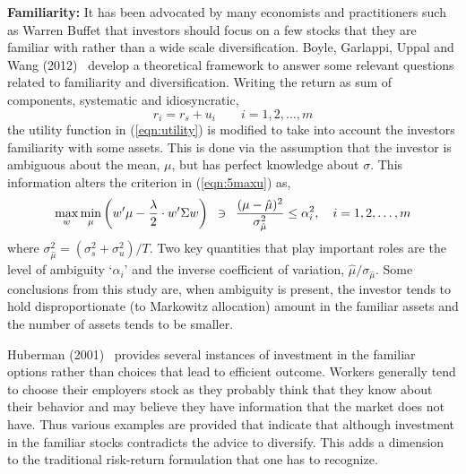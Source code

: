 \noindent \textbf{Familiarity:} It has been advocated by many economists and practitioners such as Warren Buffet that investors should focus on a few stocks that they are familiar with rather than a wide scale diversification. Boyle, Garlappi, Uppal and Wang (2012)~\cite{bguwang} develop a theoretical framework to answer some relevant questions related to familiarity and diversification. Writing the return as sum of components, systematic and idiosyncratic,
	\begin{equation}\label{eqn:rirsui}
	r_i = r_s + u_i \quad\quad i=1,2,\ldots,m
	\end{equation}
the utility function in (\ref{eqn:utility}) is modified to take into account the investors familiarity with some assets. This is done via the assumption that the investor is ambiguous about the mean, $\mu$, but has perfect knowledge about $\sigma$. This information alters the criterion in (\ref{eqn:5maxu}) as,
	\begin{equation}\label{eqn:maxminwmu}
	\max_w \min_\mu \left(w'\mu - \frac{\lambda}{2} \cdot w' \Sigma w \right)\enskip \ni \enskip\dfrac{(\mu-\hat{\mu})^2}{\sigma_{\hat{\mu}}^2} \leq \alpha_i^2, \quad i=1,2,\ldots,m
	\end{equation}
where $\sigma_{\hat{\mu}}^2= (\sigma_s^2+\sigma_u^2)/T$. Two key quantities that play important roles are the level of ambiguity `$\alpha_i$' and the inverse coefficient of variation, $\hat{\mu}/\sigma_{\hat{\mu}}$. Some conclusions from this study are, when ambiguity is present, the investor tends to hold disproportionate (to Markowitz allocation) amount in the familiar assets and the number of assets tends to be smaller.


Huberman (2001)~\cite{Hub} provides several instances of investment in the familiar options rather than choices that lead to efficient outcome. Workers generally tend to choose their employers stock as they probably think that they know about their behavior and may believe they have information that the market does not have. Thus various examples are provided that indicate that although investment in the familiar stocks contradicts the advice to diversify. This adds a dimension to the traditional risk-return formulation that one has to recognize. \\


